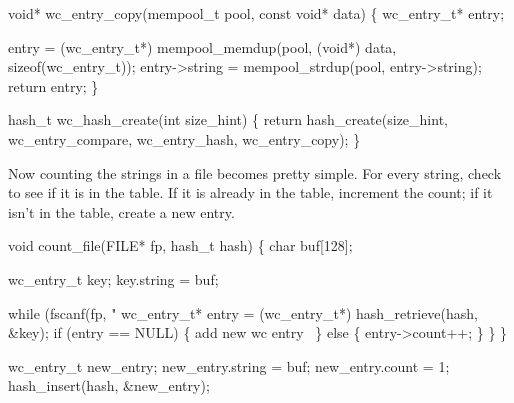 \nwendcode{}\nwdocspar

\nwenddocs{}\plusendmoddef
void* wc_entry_copy(mempool_t pool, const void* data)
\{
    wc_entry_t* entry;

    entry = (wc_entry_t*) mempool_memdup(pool, (void*) data, sizeof(wc_entry_t));
    entry->string = mempool_strdup(pool, entry->string);
    return entry;
\}

\nwendcode{}\nwdocspar

\nwenddocs{}\endmoddef
hash_t wc_hash_create(int size_hint)
\{
    return hash_create(size_hint, 
                       wc_entry_compare, 
                       wc_entry_hash,
                       wc_entry_copy);
\}

\nwendcode{}\nwdocspar

Now counting the strings in a file becomes pretty simple.
For every string, check to see if it is in the table.
If it is already in the table, increment the count; if it
isn't in the table, create a new entry.

\nwenddocs{}\plusendmoddef
void count_file(FILE* fp, hash_t hash)
\{
    char buf[128];

    wc_entry_t key;
    key.string = buf;

    while (fscanf(fp, "%
        wc_entry_t* entry = (wc_entry_t*) hash_retrieve(hash, &key);
        if (entry == NULL) \{
            \LA{}add new wc entry~{\nwtagstyle{}}\RA{}
        \} else \{
            entry->count++;
        \}
    \}   
\}

\nwendcode{}\nwdocspar

\nwenddocs{}\endmoddef
wc_entry_t new_entry;
new_entry.string = buf;
new_entry.count  = 1;
hash_insert(hash, &new_entry);
\nwendcode{}\nwdocspar

